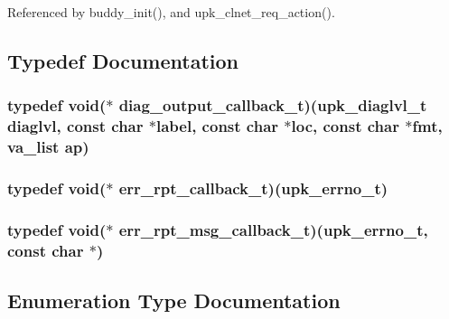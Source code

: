 Referenced by buddy\_\-init(), and upk\_\-clnet\_\-req\_\-action().



\subsection{Typedef Documentation}
\subsubsection[{diag\_\-output\_\-callback\_\-t}]{\setlength{\rightskip}{0pt plus 5cm}typedef void($\ast$ {\bf diag\_\-output\_\-callback\_\-t})({\bf upk\_\-diaglvl\_\-t} diaglvl, const char $\ast$label, const char $\ast$loc, const char $\ast$fmt, va\_\-list ap)}\label{group__upk__errors_ga87fb65c6a60c48ba64273c389d1fba1f}
\subsubsection[{err\_\-rpt\_\-callback\_\-t}]{\setlength{\rightskip}{0pt plus 5cm}typedef void($\ast$ {\bf err\_\-rpt\_\-callback\_\-t})({\bf upk\_\-errno\_\-t})}\label{group__upk__errors_ga288518a849f000cbab3a64b181b667c0}
\subsubsection[{err\_\-rpt\_\-msg\_\-callback\_\-t}]{\setlength{\rightskip}{0pt plus 5cm}typedef void($\ast$ {\bf err\_\-rpt\_\-msg\_\-callback\_\-t})({\bf upk\_\-errno\_\-t}, const char $\ast$)}\label{group__upk__errors_gaaacf9b7f9daf89c473706185f68ff493}


\subsection{Enumeration Type Documentation}

